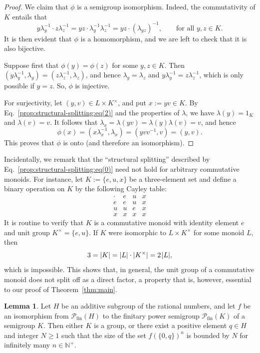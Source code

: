 \documentclass[11pt,reqno]{amsart}
\theoremstyle{definition}
\newtheorem{lemma}[theorem]{Lemma}
\theoremstyle{remark}
\theoremstyle{theoremdd}
\newcommand{\fin}{\mathrm{fin}}
\renewcommand{\,}{\kern 0.1em}
\begin{document}
\begin{proof}
We claim that $\phi$ is a semigroup isomorphism. Indeed, the commutativity of $K$ entails that
\[
y\lambda_y^{-1} \cdot z \lambda_z^{-1} = yz \cdot \lambda_y^{-1} \lambda_z^{-1} = yz \cdot (\lambda_{yz})^{-1},
\qquad\text{for all } y, z \in K.
\]
It is then evident that $\phi$ is a homomorphism, and we are left to check that it is also bijective.

Suppose first that $\phi(y) = \phi(z)$ for some $y, z \in K$. Then $(y\lambda_y^{-1}, \lambda_y) = 
(z\lambda_z^{-1}, \lambda_z)$, and hence $\lambda_y = \allowbreak \lambda_z$ and $y\lambda_y^{-1} = z\lambda_z^{-1}$, which is only possible if $y = z$. So, $\phi$ is injective.

For surjectivity, let $(y, v) \in L \times K^\times$, and put $x := yv \in K$. By Eq.~\eqref{prop:structural-splitting:eq(2)} and the properties of $\lambda$, 
we have $\lambda(y) = 1_K$ and $\lambda(v) = v$. It follows that $\lambda_x = \lambda(yv) = \lambda(y)\lambda(v) = v$, and hence
\[
\phi(x) = (x \lambda_x^{-1}, \lambda_x) = (yvv^{-1}, v) = (y, v).
\]
This proves that $\phi$ is onto (and therefore an isomorphism).
\end{proof}

Incidentally, we remark that the ``structural splitting'' described by Eq.~\eqref{prop:structural-splitting:eq(0)} need not hold for arbitrary commutative monoids. For instance, let $K := \{e,u,x\}$ be a three-element set and define a binary operation on $K$ by the following Cayley table:
\[
\begin{array}{c|ccc}
\cdot & e & u & x \\
\hline
e & e & u & x \\
u & u & e & x \\
x & x & x & x
\end{array}
\]
It is routine to verify that $K$ is a commutative monoid with identity element $e$ and unit group $K^\times = \{e, u\}$. If $K$ were isomorphic to $L \times K^\times$ for some monoid $L$, then 
\[
3 = |K| = |L| \cdot |K^\times| = 2\,|L|,
\]
which is impossible. This shows that, in general, the unit group of a commutative monoid does not split off as a direct factor, a property that is, however, essential to our proof of Theorem~\ref{thm:main}.


\begin{lemma}
\label{lem:bounding-the-size-of-powers}
Let $H$ be an additive subgroup of the rational numbers, and let $f$ be an isomorphism from $\mathcal P_\fin(H)$ to the finitary power semigroup $\mathcal P_\fin(K)$ of a semigroup $K$. Then either $K$ is a group, or there exist a positive element $q \in H$ and integer $N \ge 1$ such that the size of the set $f(\{0, q\})^n$ is bounded by $N$ for infinitely many $n \in \mathbb N^+$.
\end{lemma}
\end{document}
